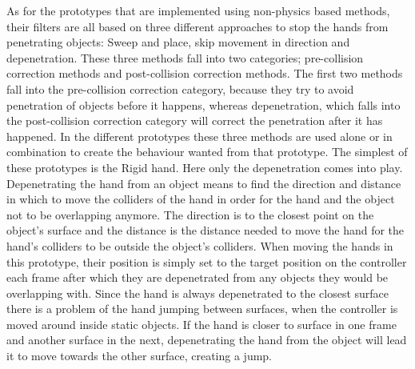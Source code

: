 As for the prototypes that are implemented using non-physics based methods, their filters are all based on three different approaches to stop the hands from penetrating objects: Sweep and place, skip movement in direction and depenetration. These three methods fall into two categories; pre-collision correction methods and post-collision correction methods. The first two methods fall into the pre-collision correction category, because they try to avoid penetration of objects before it happens, whereas depenetration, which falls into the post-collision correction category will correct the penetration after it has happened. In the different prototypes these three methods are used alone or in combination to create the behaviour wanted from that prototype. The simplest of these prototypes is the Rigid hand. Here only the depenetration comes into play. Depenetrating the hand from an object means to find the direction and distance in which to move the colliders of the hand in order for the hand and the object not to be overlapping anymore. The direction is to the closest point on the object's surface and the distance is the distance needed to move the hand for the hand's colliders to be outside the object's colliders. When moving the hands in this prototype, their position is simply set to the target position on the controller each frame after which they are depenetrated from any objects they would be overlapping with. Since the hand is always depenetrated to the closest surface there is a problem of the hand jumping between surfaces, when the controller is moved around inside static objects. If the hand is closer to surface in one frame and another surface in the next, depenetrating the hand from the object will lead it to move towards the other surface, creating a jump.

